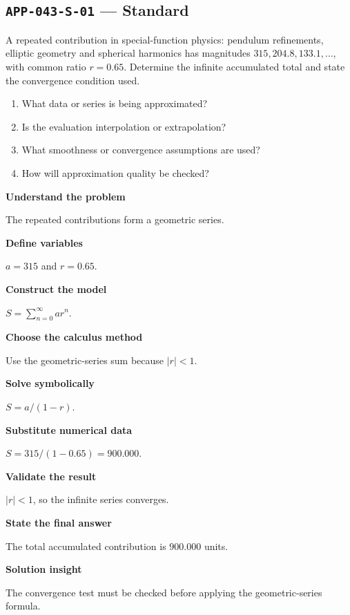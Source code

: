 \documentclass[11pt]{book}
\newcommand{\pid}[1]{\texttt{#1}}
\begin{document}
\subsection*{\pid{APP-043-S-01} — Standard}
\begin{problembox}
A repeated contribution in special-function physics: pendulum refinements, elliptic geometry and spherical harmonics has magnitudes $315, 204.8, 133.1,\ldots$, with common ratio $r=0.65$. Determine the infinite accumulated total and state the convergence condition used.
\end{problembox}
\begin{promptbox}\begin{enumerate}
\item What data or series is being approximated?
\item Is the evaluation interpolation or extrapolation?
\item What smoothness or convergence assumptions are used?
\item How will approximation quality be checked?
\end{enumerate}\end{promptbox}
\begin{solutionbox}
\textbf{Understand the problem}\par The repeated contributions form a geometric series.\par\medskip
\textbf{Define variables}\par $a=315$ and $r=0.65$.\par\medskip
\textbf{Construct the model}\par $S=\sum_{n=0}^{\infty}ar^n$.\par\medskip
\textbf{Choose the calculus method}\par Use the geometric-series sum because $|r|<1$.\par\medskip
\textbf{Solve symbolically}\par $S=a/(1-r)$.\par\medskip
\textbf{Substitute numerical data}\par $S=315/(1-0.65)=900.000$.\par\medskip
\textbf{Validate the result}\par $|r|<1$, so the infinite series converges.\par\medskip
\textbf{State the final answer}\par The total accumulated contribution is $900.000$ units.\par\medskip
\textbf{Solution insight}\par The convergence test must be checked before applying the geometric-series formula.\par\medskip
\end{solutionbox}
\end{document}
